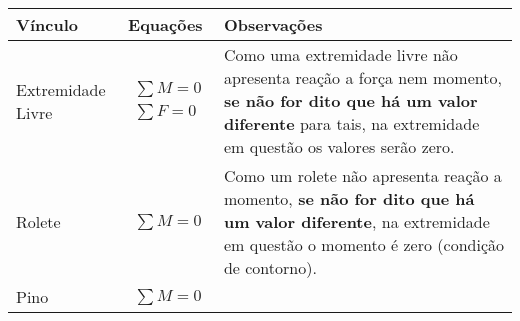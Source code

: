 \documentclass{article}
\begin{document}
        \begin{table}[h]
            \tiny
            \centering
        \begin{tabularx}{\textwidth}{|X|X|X|}\hline
                \textbf{Vínculo} & \textbf{Equações} & \textbf{Observações} \\ \hline
                Extremidade Livre  & 
                    \begin{minipage}{.3\textwidth}
                        \begin{align*}
                            \sum M = 0 \\ 
                            \sum F = 0
                        \end{align*}
                    \end{minipage} &
                    
                    \begin{minipage}{.3\textwidth}
                        \vspace{5px}
                        Como uma extremidade livre não apresenta reação a força nem momento, \textbf{se não for dito que há um valor diferente} para tais, na extremidade em questão os valores serão zero.
                    \end{minipage} \\ \hline

                Rolete & 
                    \begin{minipage}{.3\textwidth}
                        \begin{align*}
                            \sum M = 0
                        \end{align*}
                    \end{minipage} &
                    
                    \begin{minipage}{.3\textwidth}
                        \vspace{5px}
                        Como um rolete não apresenta reação a momento, \textbf{se não for dito que há um valor diferente}, na extremidade em questão  o momento é zero (condição de contorno).
                    \end{minipage} \\ \hline                       

                Pino & 
                    \begin{minipage}{.3\textwidth}
                        \begin{align*}
                            \sum M = 0
                        \end{align*}
                    \end{minipage} &
                    

\end{tabularx}
\end{table}
\end{document}
